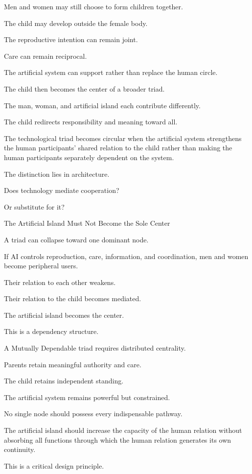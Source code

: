Men and women may still choose to form children together.

The child may develop outside the female body.

The reproductive intention can remain joint.

Care can remain reciprocal.

The artificial system can support rather than replace the human circle.

The child then becomes the center of a broader triad.

The man, woman, and artificial island each contribute differently.

The child redirects responsibility and meaning toward all.

The technological triad becomes circular when the artificial system strengthens the human participants’ shared relation to the child rather than making the human participants separately dependent on the system.

The distinction lies in architecture.

Does technology mediate cooperation?

Or substitute for it?

The Artificial Island Must Not Become the Sole Center

A triad can collapse toward one dominant node.

If AI controls reproduction, care, information, and coordination, men and women become peripheral users.

Their relation to each other weakens.

Their relation to the child becomes mediated.

The artificial island becomes the center.

This is a dependency structure.

A Mutually Dependable triad requires distributed centrality.

Parents retain meaningful authority and care.

The child retains independent standing.

The artificial system remains powerful but constrained.

No single node should possess every indispensable pathway.

The artificial island should increase the capacity of the human relation without absorbing all functions through which the human relation generates its own continuity.

This is a critical design principle.


